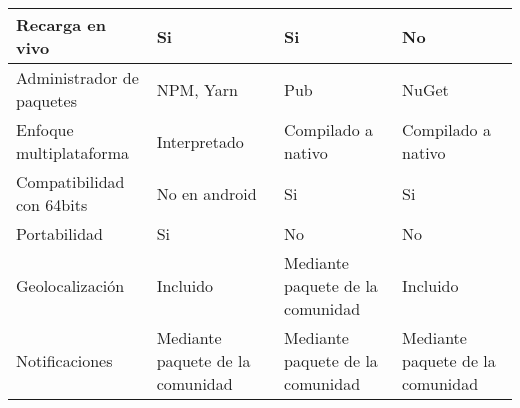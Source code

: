 \begin{longtable}{|p{3cm}|p{3cm}|p{3cm}|p{3cm}|}
    Recarga en vivo                                & Si                                                        & Si                                                                                                             & No                                                                                                                           \\\hline
    Administrador de paquetes                      & NPM, Yarn                                                 & Pub                                                                                                            & NuGet                                                                                                                        \\\hline
    Enfoque multiplataforma                        & Interpretado                                              & Compilado a nativo                                                                                             & Compilado a nativo                                                                                                           \\\hline
    Compatibilidad con 64bits                      & No en android                                             & Si                                                                                                             & Si                                                                                                                           \\\hline
    Portabilidad                                   & Si                                                        & No                                                                                                             & No                                                                                                                           \\\hline
    Geolocalización                                & Incluido                                                  & Mediante paquete de la comunidad                                                                               & Incluido                                                                                                                     \\\hline
    Notificaciones                                 & Mediante paquete de la comunidad                          & Mediante paquete de la comunidad                                                                               & Mediante paquete de la comunidad                                                                                             \\\hline

\end{longtable}
